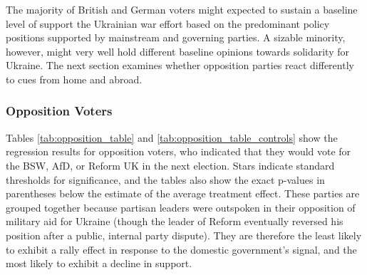 \begin{appendices}
The majority of British and German voters might expected to sustain a baseline level of support the Ukrainian war effort based on the predominant policy positions supported by mainstream and governing parties. A sizable minority, however, might very well hold different baseline opinions towards solidarity for Ukraine. The next section examines whether opposition parties react differently to cues from home and abroad. 

\subsubsection{Opposition Voters}
Tables \ref{tab:opposition_table} and \ref{tab:opposition_table_controls} show the regression results for opposition voters, who indicated that they would vote for the BSW, AfD, or Reform UK in the next election. Stars indicate standard thresholds for significance, and the tables also show the exact p-values in parentheses below the estimate of the average treatment effect. These parties are grouped together because partisan leaders were outspoken in their opposition of military aid for Ukraine (though the leader of Reform eventually reversed his position after a public, internal party dispute). They are therefore the least likely to exhibit a rally effect in response to the domestic government's signal, and the most likely to exhibit a decline in support. 


\end{appendices}
